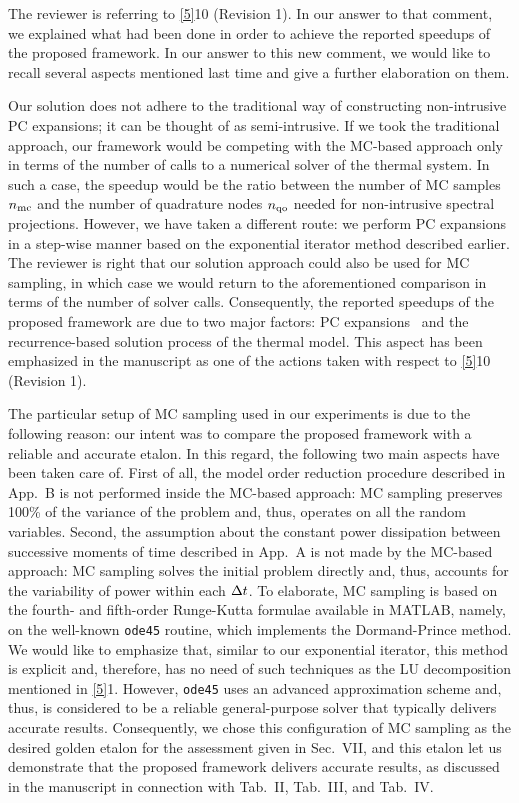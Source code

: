 \begin{authors}
The reviewer is referring to \cref{5}{10 (Revision 1)}.
In our answer to that comment, we explained what had been done in order to achieve the reported speedups of the proposed framework.
In our answer to this new comment, we would like to recall several aspects mentioned last time and give a further elaboration on them.

Our solution does not adhere to the traditional way of constructing non-intrusive PC expansions; it can be thought of as semi-intrusive.
If we took the traditional approach, our framework would be competing with the MC-based approach only in terms of the number of calls to a numerical solver of the thermal system.
In such a case, the speedup would be the ratio between the number of MC samples ${n_\text{mc}}$ and the number of quadrature nodes ${n_\text{qo}}$ needed for non-intrusive spectral projections.
However, we have taken a different route: we perform PC expansions in a step-wise manner based on the exponential iterator method described earlier.
The reviewer is right that our solution approach could also be used for MC sampling, in which case we would return to the aforementioned comparison in terms of the number of solver calls.
Consequently, the reported speedups of the proposed framework are due to two major factors: PC expansions \perse\ and the recurrence-based solution process of the thermal model.
This aspect has been emphasized in the manuscript as one of the actions taken with respect to \cref{5}{10 (Revision 1)}.

The particular setup of MC sampling used in our experiments is due to the following reason: our intent was to compare the proposed framework with a reliable and accurate etalon.
In this regard, the following two main aspects have been taken care of.
First of all, the model order reduction procedure described in App.~B is not performed inside the MC-based approach: MC sampling preserves 100\% of the variance of the problem and, thus, operates on all the random variables.
Second, the assumption about the constant power dissipation between successive moments of time described in App.~A is not made by the MC-based approach: MC sampling solves the initial problem directly and, thus, accounts for the variability of power within each $\Delta t$.
To elaborate, MC sampling is based on the fourth- and fifth-order Runge-Kutta formulae available in MATLAB, namely, on the well-known \texttt{ode45} routine, which implements the Dormand-Prince method.
We would like to emphasize that, similar to our exponential iterator, this method is explicit and, therefore, has no need of such techniques as the LU decomposition mentioned in \cref{5}{1}.
However, \texttt{ode45} uses an advanced approximation scheme and, thus, is considered to be a reliable general-purpose solver that typically delivers accurate results.
Consequently, we chose this configuration of MC sampling as the desired golden etalon for the assessment given in Sec.~VII, and this etalon let us demonstrate that the proposed framework delivers accurate results, as discussed in the manuscript in connection with Tab.~II, Tab.~III, and Tab.~IV.


\end{authors}
